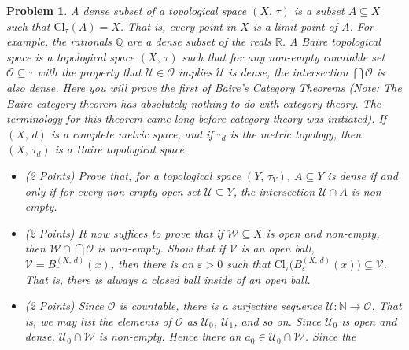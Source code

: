 \documentclass{article}
\theoremstyle{normal}
\newtheorem{problem}{Problem}
\begin{document}
    \clearpage
    \color{blue}
    \begin{problem}
        A dense subset of a topological space $(X,\,\tau)$ is a subset
        $A\subseteq{X}$ such that $\textrm{Cl}_{\tau}(A)=X$. That is, every
        point in $X$ is a limit point of $A$. For example, the rationals
        $\mathbb{Q}$ are a dense subset of the reals $\mathbb{R}$.
        A Baire topological space is a topological space $(X,\,\tau)$ such that
        for any non-empty countable set $\mathcal{O}\subseteq\tau$ with the
        property that $\mathcal{U}\in\mathcal{O}$ implies $\mathcal{U}$ is
        dense, the intersection $\bigcap\mathcal{O}$ is also dense. Here you
        will prove the first of Baire's Category Theorems (Note: The Baire
        category theorem has absolutely nothing to do with category theory.
        The terminology for this theorem came long before category theory was
        initiated). If $(X,\,d)$ is a complete metric space, and if
        $\tau_{d}$ is the metric topology, then $(X,\,\tau_{d})$ is a Baire
        topological space.
        \begin{itemize}
            \item (2 Points) Prove that, for a topological space
                $(Y,\,\tau_{Y})$, $A\subseteq{Y}$ is dense if and only if
                for every non-empty open set $\mathcal{U}\subseteq{Y}$, the
                intersection $\mathcal{U}\cap{A}$ is non-empty.
            \item (2 Points) It now suffices to prove that if
                $\mathcal{W}\subseteq{X}$ is open and non-empty, then
                $\mathcal{W}\cap\bigcap\mathcal{O}$ is non-empty. Show that if
                $\mathcal{V}$ is an open ball,
                $\mathcal{V}=B_{r}^{(X,\,d)}(x)$, then there is an
                $\varepsilon>0$ such that
                $\textrm{Cl}_{\tau}\big(B_{\varepsilon}^{(X,\,d)}(x)\big)\subseteq\mathcal{V}$.
                That is, there is always a \textit{closed ball} inside of an
                open ball.
            \item (2 Points) Since $\mathcal{O}$ is countable, there is a
                surjective sequence
                $\mathcal{U}:\mathbb{N}\rightarrow\mathcal{O}$. That
                is, we may list the elements of $\mathcal{O}$ as $\mathcal{U}_{0}$,
                $\mathcal{U}_{1}$, and so on. Since $\mathcal{U}_{0}$ is open
                and dense, $\mathcal{U}_{0}\cap\mathcal{W}$ is non-empty. Hence
                there an $a_{0}\in\mathcal{U}_{0}\cap\mathcal{W}$. Since the

\end{itemize}
\end{problem}
\end{document}
